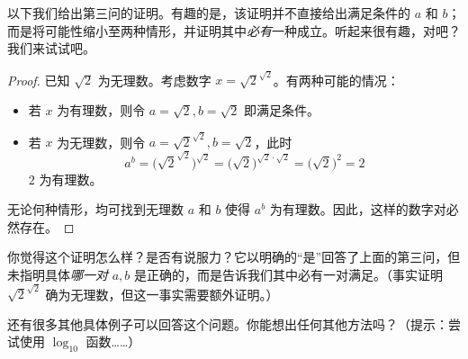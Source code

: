 以下我们给出第三问的证明。有趣的是，该证明并不直接给出满足条件的 $a$ 和 $b$；而是将可能性缩小至两种情形，并证明其中\emph{必有}一种成立。听起来很有趣，对吧？我们来试试吧。

\begin{proof}
    已知 $\sqrt{2}$ 为无理数。考虑数字 $x = \sqrt{2}^{\sqrt{2}}$。有两种可能的情况：
    \begin{itemize}
        \item 若 $x$ 为有理数，则令 $a = \sqrt{2}, b = \sqrt{2}$ 即满足条件。
        \item 若 $x$ 为无理数，则令 $a = \sqrt{2}^{\sqrt{2}}, b = \sqrt{2}$，此时
        \[a^b = \Bigg(\sqrt{2}^{\sqrt{2}}\Bigg)^{\sqrt{2}} = \Big(\sqrt{2}\Big)^{\sqrt{2} \cdot \sqrt{2}} = \Big(\sqrt{2}\Big)^2 = 2\]
        $2$ 为有理数。
    \end{itemize}
    无论何种情形，均可找到无理数 $a$ 和 $b$ 使得 $a^b$ 为有理数。因此，这样的数字对必然存在。
\end{proof}

你觉得这个证明怎么样？是否有说服力？它以明确的``是''回答了上面的第三问，但未指明具体\emph{哪一对} $a, b$ 是正确的，而是告诉我们其中必有一对满足。（事实证明 $\sqrt{2}^{\sqrt{2}}$ 确为无理数，但这一事实需要额外证明。）

还有很多其他具体例子可以回答这个问题。你能想出任何其他方法吗？（提示：尝试使用 $\log_{10}$ 函数……）
